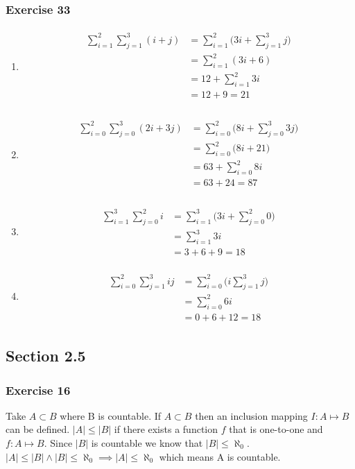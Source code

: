 \documentclass[a4paper]{article}
\newcommand{\ex}[1]{\subsubsection*{#1}}
\newcommand{\eqns}[1]{
    \begin{align}
        \begin{split} \nonumber
            #1
        \end{split}
    \end{align}
}
\begin{document}
\ex{Exercise 33}
\begin{enumerate}[label=\alph*)]
    \item \eqns {
            \sum_{i=1}^2{\sum_{j=1}^{3}{(i+j)}} &= 
                \sum_{i=1}^2{ \big( 3i + \sum_{j=1}^3{ j } \big) }\\
            &= \sum_{i=1}^2{ (3i + 6) }\\
            &= 12 + \sum_{i=1}^2{ 3i  }\\
            &= 12 + 9 = 21\\
    }

    \item \eqns { 
            \sum_{i=0}^2{\sum_{j=0}^{3}{(2i+3j)}} &= 
                \sum_{i=0}^2{ \big( 8i + \sum_{j=0}^3{ 3j } \big) }\\
            &= \sum_{i=0}^2{ \big( 8i + 21 \big) }\\
            &= 63 + \sum_{i=0}^2{  8i  }\\
            &= 63 + 24 = 87\\
    }

    \item \eqns {
            \sum_{i=1}^3{\sum_{j=0}^{2}{i}} &= 
                \sum_{i=1}^3{ \big( 3i + \sum_{j=0}^2{ 0 } \big) }\\
            &= \sum_{i=1}^3{  3i  }\\
            &= 3 + 6 + 9 = 18
    }

    \item \eqns {
            \sum_{i=0}^2{ \sum_{j=1}^3{  ij  } } &= 
                \sum_{i=0}^2{ \big( i \sum_{j=1}^3{ j } \big) } \\
            &= \sum_{i=0}^2{ 6i  } \\
            &= 0 + 6 + 12 = 18
    }

\end{enumerate}


\vspace{2em}
\subsection*{Section 2.5}
\vspace{1em}

\ex{Exercise 16}
    Take \(A \subset B\) where B is countable. If \(A \subset B\) then an
    inclusion mapping \(I: A \mapsto B\) can be defined. \(|A| \leq |B|\) if
    there exists a function \(f\) that is one-to-one and \(f: A \mapsto B\).
    Since \(|B|\) is countable we know that \(|B| \leq \aleph_0\). \(|A| \leq
    |B| \land |B| \leq \aleph_0 \implies |A| \leq \aleph_0\) which means A is
    countable. 
    


%
\end{document}
